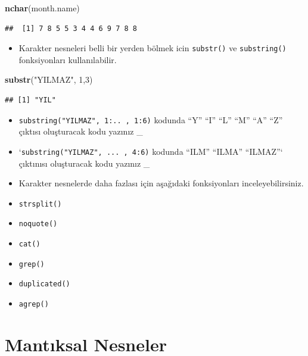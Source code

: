 \documentclass[
  oneside]{book}
\newenvironment{Shaded}{\begin{snugshade}}{\end{snugshade}}
\newcommand{\DecValTok}[1]{\textcolor[rgb]{0.00,0.00,0.81}{#1}}
\newcommand{\FunctionTok}[1]{\textcolor[rgb]{0.13,0.29,0.53}{\textbf{#1}}}
\newcommand{\NormalTok}[1]{#1}
\newcommand{\StringTok}[1]{\textcolor[rgb]{0.31,0.60,0.02}{#1}}
\providecommand{\tightlist}{%
  \setlength{\itemsep}{0pt}\setlength{\parskip}{0pt}}
\begin{document}
\begin{Shaded}
\begin{Highlighting}[]
\FunctionTok{nchar}\NormalTok{(month.name)}
\end{Highlighting}
\end{Shaded}

\begin{verbatim}
##  [1] 7 8 5 5 3 4 4 6 9 7 8 8
\end{verbatim}

\begin{itemize}
\tightlist
\item
  Karakter nesneleri belli bir yerden bölmek icin \texttt{substr()} ve \texttt{substring()} fonksiyonları kullanılabilir.
\end{itemize}

\begin{Shaded}
\begin{Highlighting}[]
\FunctionTok{substr}\NormalTok{(}\StringTok{"YILMAZ"}\NormalTok{, }\DecValTok{1}\NormalTok{,}\DecValTok{3}\NormalTok{)}
\end{Highlighting}
\end{Shaded}

\begin{verbatim}
## [1] "YIL"
\end{verbatim}

\begin{itemize}
\item
  \texttt{substring("YILMAZ",\ 1:..\ ,\ 1:6)} kodunda ``Y'' ``I'' ``L'' ``M'' ``A'' ``Z'' çıktısı oluşturacak kodu yazınız \_
\item
  `\texttt{substring("YILMAZ",\ ...\ ,\ 4:6)} kodunda ``ILM'' ``ILMA'' ``ILMAZ''` çıktınısı oluşturacak kodu yazınız \_
\item
  Karakter nesnelerde daha fazlası için aşağıdaki fonksiyonları inceleyebilirsiniz.
\item
  \texttt{strsplit()}
\item
  \texttt{noquote()}
\item
  \texttt{cat()}
\item
  \texttt{grep()}
\item
  \texttt{duplicated()}
\item
  \texttt{agrep()}
\end{itemize}

\hypertarget{mantux131ksal-nesneler}{%
\section{Mantıksal Nesneler}\label{mantux131ksal-nesneler}}
\end{document}
